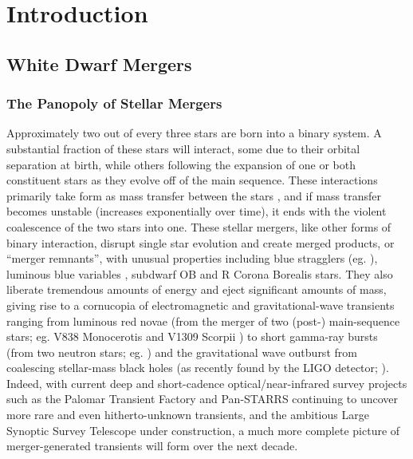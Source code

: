 \chapter{Introduction}

\section{White Dwarf Mergers}
\label{sec:wdmergers}

\subsection{The Panopoly of Stellar Mergers}
\label{ssec:stellarmergers}

Approximately two out of every three stars are born into a binary system.  A substantial fraction of these stars will interact, some due to their orbital separation at birth, while others following the expansion of one or both constituent stars as they evolve off of the main sequence.  These interactions primarily take form as mass transfer between the stars \citep{yung05}, and if mass transfer becomes unstable (increases exponentially over time), it ends with the violent coalescence of the two stars into one.  These stellar mergers, like other forms of binary interaction, disrupt single star evolution and create merged products, or ``merger remnants'', with unusual properties including blue stragglers (eg. \citealt{andrpt06, knigs09}), luminous blue variables \citep{justpv14}, subdwarf OB and R Corona Borealis stars.  They also liberate tremendous amounts of energy and eject significant amounts of mass, giving rise to a cornucopia of electromagnetic and gravitational-wave transients ranging from luminous red novae (from the merger of two (post-) main-sequence stars; eg. V838 Monocerotis and V1309 Scorpii \citep{tyle+11, nandil14}) to short gamma-ray bursts (from two neutron stars; eg. \cite{ross15}) and the gravitational wave outburst from coalescing stellar-mass black holes (as recently found by the LIGO detector; \citealt{ligo16}).  Indeed, with current deep and short-cadence optical/near-infrared survey projects such as the Palomar Transient Factory \citep{rau+09} and Pan-STARRS \citep{kais+10} continuing to uncover more rare and even hitherto-unknown transients, and the ambitious Large Synoptic Survey Telescope \citep{lsst09} under construction, a much more complete picture of merger-generated transients will form over the next decade.


